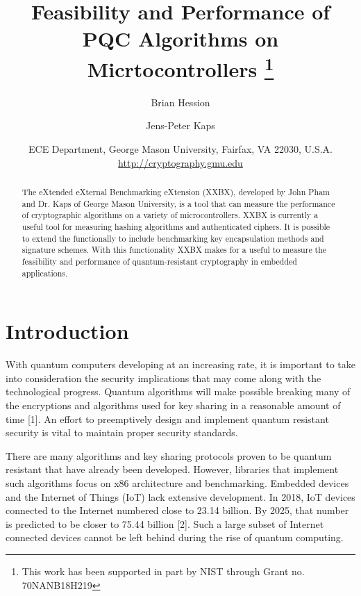 \documentclass[10pt]{article}
\begin{document}
\title{Feasibility and Performance of PQC Algorithms on Micrtocontrollers %
\thanks{This work has been supported in part by NIST through
Grant no. 70NANB18H219}%
} 

\author{Brian Hession \and Jens-Peter Kaps}

\date{ECE Department, George Mason University, Fairfax, VA 22030, U.S.A.\\
\url{http://cryptography.gmu.edu}}%

\maketitle

\begin{abstract}
The eXtended eXternal Benchmarking eXtension (XXBX), developed by John Pham and Dr. Kaps 
of George Mason University, is a tool that can measure the performance of cryptographic 
algorithms on a variety of microcontrollers. XXBX is currently a useful tool for measuring 
hashing algorithms and authenticated ciphers. It is possible to extend the functionally to 
include benchmarking key encapsulation methods and signature schemes. With this functionality 
XXBX makes for a useful to measure the feasibility and performance of quantum-resistant 
cryptography in embedded applications.
\end{abstract}


\section{Introduction}

With quantum computers developing at an increasing rate, it is important to take into 
consideration the security implications that may come along with the technological progress. 
Quantum algorithms will make possible breaking many of the encryptions and algorithms used for 
key sharing in a reasonable amount of time [1]. An effort to preemptively design and implement 
quantum resistant security is vital to maintain proper security standards.

There are many algorithms and key sharing protocols proven to be quantum resistant that have 
already been developed. However, libraries that implement such algorithms focus on x86 
architecture and benchmarking. Embedded devices and the Internet of Things (IoT) lack extensive 
development. In 2018, IoT devices connected to the Internet numbered close to 23.14 billion. 
By 2025, that number is predicted to be closer to 75.44 billion [2]. Such a large subset of Internet 
connected devices cannot be left behind during the rise of quantum computing.
\end{document}
